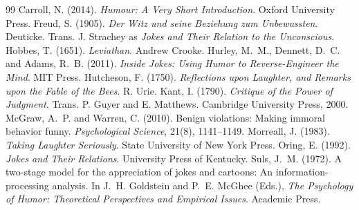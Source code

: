 \documentclass{situationist-preprint}
\begin{document}
\begin{thebibliography}{99}\small
{} Carroll, N. (2014). \emph{Humour: A Very Short Introduction}. Oxford University Press.
 Freud, S. (1905). \emph{Der Witz und seine Beziehung zum Unbewussten}. Deuticke. Trans. J. Strachey as \emph{Jokes and Their Relation to the Unconscious}.
 Hobbes, T. (1651). \emph{Leviathan}. Andrew Crooke.
 Hurley, M.~M., Dennett, D.~C. and Adams, R.~B. (2011). \emph{Inside Jokes: Using Humor to Reverse-Engineer the Mind}. MIT Press.
 Hutcheson, F. (1750). \emph{Reflections upon Laughter, and Remarks upon the Fable of the Bees}. R. Urie.
 Kant, I. (1790). \emph{Critique of the Power of Judgment}. Trans. P. Guyer and E. Matthews. Cambridge University Press, 2000.
 McGraw, A.~P. and Warren, C. (2010). Benign violations: Making immoral behavior funny. \emph{Psychological Science}, 21(8), 1141--1149.
 Morreall, J. (1983). \emph{Taking Laughter Seriously}. State University of New York Press.
 Oring, E. (1992). \emph{Jokes and Their Relations}. University Press of Kentucky.
 Suls, J.~M. (1972). A two-stage model for the appreciation of jokes and cartoons: An information-processing analysis. In J.~H. Goldstein and P.~E. McGhee (Eds.), \emph{The Psychology of Humor: Theoretical Perspectives and Empirical Issues}. Academic Press.
\end{thebibliography}
\end{document}
